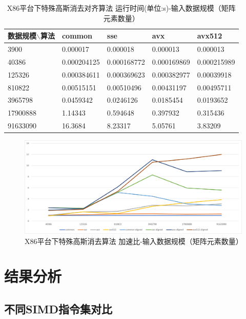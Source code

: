 \documentclass[a4paper]{article}
\begin{document}
\begin{table}[!ht]
    \centering
    \begin{tabular}{|l|l|l|l|l|}
    \hline
        数据规模$\backslash$算法 & common & sse & avx & avx512 \\ \hline
        3900 & 0.000017 & 0.000018 & 0.000013 & 0.000013 \\ \hline
        40386 & 0.000204125 & 0.000168772 & 0.000169869 & 0.000215989 \\ \hline
        125326 & 0.000384611 & 0.000369623 & 0.000382977 & 0.00039918 \\ \hline
        810822 & 0.00515151 & 0.00510496 & 0.00431197 & 0.00495711 \\ \hline
        3965798 & 0.0459342 & 0.0246126 & 0.0185454 & 0.0193652 \\ \hline
        17900888 & 1.14343 & 0.594648 & 0.397932 & 0.315436 \\ \hline
        91633090 & 16.3684 & 8.23317 & 5.05761 & 3.83209 \\ \hline
    \end{tabular}
    \caption{X86平台下特殊高斯消去对齐算法 运行时间(单位:s)-输入数据规模（矩阵元素数量）}
    \label{table:x86_groebner_aligned_timing}
\end{table}

\begin{figure}[H]
    \centering
    \includegraphics[width=6.2in]{fig/x86_groebner.png}
    \caption{X86平台下特殊高斯消去算法 加速比-输入数据规模（矩阵元素数量）}
    \label{fig:x86_groebner}
\end{figure}

\section{结果分析}
\subsection{不同SIMD指令集对比}
\end{document}

